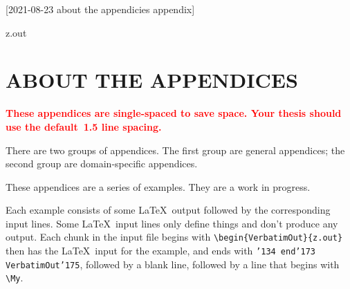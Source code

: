 [2021-08-23 about the appendicies appendix]

\begin{VerbatimOut}{z.out}
\chapter{ABOUT THE APPENDICES}


\textcolor{red}{%
  \textbf{%
    These appendices are single-spaced to save space.
    Your thesis should use the default~1.5 line spacing.%
  }%
}

There are two groups of appendices.
The first group are general appendices;
the second group are domain-specific appendices.

These appendices are a series of examples.
They are a work in progress.

Each example consists of some \LaTeX\ output
followed by the corresponding input lines.
Some \LaTeX\ input lines only define things
and don't produce any output.
Each chunk in the input file begins with
\verb+\begin{VerbatimOut}{z.out}+
then has the \LaTeX\ input for the example,
and ends with {\tt \char'134 end\char'173 VerbatimOut\char'175},
followed by a blank line,
followed by a line that begins with
\verb+\My+.

\end{VerbatimOut}

\MyIO


